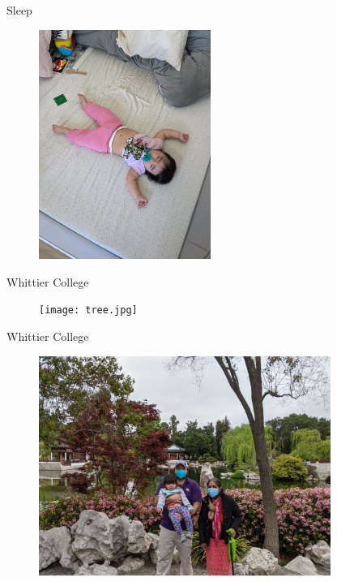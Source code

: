 \documentclass{beamer}
\begin{document}
\begin{frame}{Sleep}
\begin{figure}
\includegraphics[width=0.5\textwidth]{sleep.jpg}
\end{figure}
\end{frame}

\begin{frame}{Whittier College}
\begin{figure}
\texttt{[image: tree.jpg]}
\end{figure}
\end{frame}

\begin{frame}{Whittier College}
\begin{figure}
\includegraphics[width=0.85\textwidth]{photo1.jpg}
\end{figure}
\end{frame}
\end{document}
